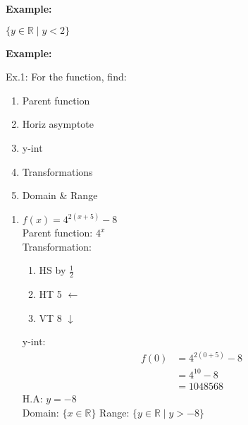 \documentclass[12pt,a4paper]{article}
\newenvironment{example}
  {\begin{framed}\colorbox{examplecolor}{
  \parbox{\dimexpr\linewidth-2\fboxsep}{
  \textbf{Example:}}}}
  {\end{framed}}
\begin{document}
\begin{example}
\begin{enumerate}
\begin{minipage}{0.8\textwidth}
    \end{minipage}
   \vspace{0.5cm}
   
   $\{y \in \mathbb{R} \mid y < 2\}$   
\end{enumerate}
\end{example}

\newpage 
\begin{example}
    Ex.1: For the function, find:
        \begin{enumerate}
            \item Parent function 
            \item Horiz asymptote
            \item y-int
            \item Transformations
            \item Domain \& Range 
        \end{enumerate}
    \begin{enumerate}[label=\alph*.]
    \item $f(x)= 4^{2(x+5)}-8$ \\
    Parent function: $4^x$ \\
    Transformation: 
    \begin{enumerate}
        \item HS by $\frac{1}{2}$
        \item HT 5 $\gets$
        \item VT 8 $\downarrow$
    \end{enumerate}
    y-int:
    \begin{align*}
        f(0) & = 4^{2(0+5)}-8 \\
        & = 4^{10}-8 \\
        & = 1048568
    \end{align*}
    H.A: $ y= -8$ \\ 
    Domain: $\{x \in \mathbb{R}\}$
    Range:  $\{y \in \mathbb{R} \mid y > -8\}$
    \end{enumerate}
\end{example}
\end{document}
